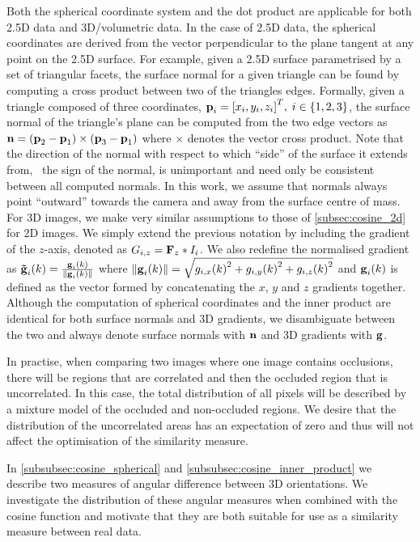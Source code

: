 Both the spherical coordinate system and the dot product are applicable for
both 2.5D data and 3D/volumetric data. In the case of 2.5D data, the spherical
coordinates are derived from the vector perpendicular to the plane tangent
at any point on the 2.5D surface. For example, given a 2.5D surface parametrised
by a set of triangular facets, the surface normal for a given triangle
can be found by computing a cross product between two of the triangles edges.
Formally, given a triangle composed of three coordinates, 
$\boldsymbol{\mathbf{p}}_i = {[x_i, y_i, z_i]}^T, \; i \in \{1, 2, 3\}$, the surface normal of
the triangle's plane can be computed from the two edge vectors as
$\boldsymbol{\mathbf{n}} = (\boldsymbol{\mathbf{p}}_2 - \boldsymbol{\mathbf{p}}_1) \times (\boldsymbol{\mathbf{p}}_3 - \boldsymbol{\mathbf{p}}_1)$ where
$\times$ denotes the vector cross product. Note that the direction of the normal
with respect to which ``side'' of the surface it extends from,
\eg~the sign of the normal, is unimportant and need only be consistent between
all computed normals. In this work, we assume that normals always point 
``outward'' towards the camera and away from the surface centre of mass.
For 3D images, we make very similar
assumptions to those of \cref{subsec:cosine_2d} for 2D images. 
We simply extend the previous notation by including the gradient of the
$z$-axis, denoted as $G_{i,z} = \boldsymbol{\mathbf{F}}_z \ast I_i$.
We also redefine the normalised gradient as
$\boldsymbol{\mathbf{\tilde{g}}}_{i}(k) = \frac{\boldsymbol{\mathbf{g}}_{i}(k)}{\lVert{} \boldsymbol{\mathbf{g}}_{i}(k) \rVert}$
where $\lVert{} \boldsymbol{\mathbf{g}}_{i}(k) \rVert = \sqrt{{g_{i,x}(k)}^2 + {g_{i,y}(k)}^2 +
{g_{i,z}(k)}^2}$ and $\boldsymbol{\mathbf{g}}_{i}(k)$ is defined as the vector formed by
concatenating the $x$, $y$ and $z$ gradients together. Although the
computation of spherical coordinates and the inner product are identical for
both surface normals and 3D gradients, we disambiguate between the two and
always denote surface normals with $\boldsymbol{\mathbf{n}}$ and 3D gradients with $\boldsymbol{\mathbf{g}}$.

In practise, when comparing two images where one image contains occlusions,
there will be regions that are correlated and then the occluded region that is
uncorrelated. In this case, the total distribution of all pixels will be
described by a mixture model of the occluded and non-occluded regions. We desire
that the distribution of the uncorrelated areas has an expectation of zero and
thus will not affect the optimisation of the similarity measure.

In \cref{subsubsec:cosine_spherical} and
\cref{subsubsec:cosine_inner_product} we describe two measures of angular
difference between 3D orientations. We investigate the distribution of these 
angular measures when combined with the cosine function and motivate that they 
are both suitable for use as a similarity measure between real data.
